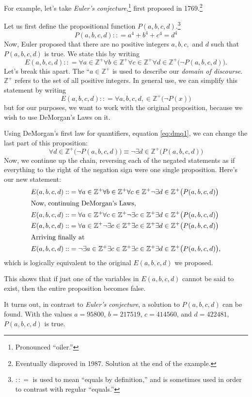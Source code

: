 \begin{ex}
  For example, let's take \emph{Euler's conjecture},\footnote{Pronounced ``oiler.''} first proposed in 1769.\footnote{Eventually disproved in 1987. Solution at the end of the example.}

  Let us first define the propositional function $P(a,b,c,d)$.\footnote{ $ : : = $ is used to mean ``equals by definition,'' and is sometimes used in order to contrast with regular ``equals.''}
  \[P(a,b,c,d) : : =
    a^4 + b^4 + c^4 = d^4\]
Now, Euler proposed that there are no positive integers $a, b, c,$ and $d$ such that $P(a,b,c,d)$ is true. We state this by writing
  \[ E(a,b,c,d) : : =
    \forall a \in \mathbb{Z^+}
    \forall b \in \mathbb{Z^+}
    \forall c \in \mathbb{Z^+}
    \forall d \in \mathbb{Z^+}
    \big(\neg P(a,b,c,d) \big).\]
Let's break this apart.
The ``$a \in \mathbb{Z^+}$ is used to describe our \emph{domain of discourse}.
$\mathbb{Z^+}$ refers to the set of all positive integers.
In general use, we can simplify this statement by writing
\[ E(a,b,c,d) : : =
  \forall a,b,c,d, \in \mathbb{Z^+} \big( \neg P(x)\big)\]
but for our purposes, we want to work with the original proposition, because we wish to use DeMorgan's Laws on it.

Using DeMorgan's first law for quantifiers, equation \eqref{eq:dmq1}, we can change the last part of this proposition:
\[\forall d \in \mathbb{Z^+} \big(\neg P(a,b,c,d)\big)\equiv \neg \exists d \in \mathbb{Z^+} \big(P(a,b,c,d)\big)\]
Now, we continue up the chain, reversing each of the negated statements as if everything to the right of the negation sign were one single proposition.
Here's our new statement:
\begin{align*}
  E(a,b,c,d) : : &=
  \forall a \in \mathbb{Z^+}
  \forall b \in \mathbb{Z^+}
  \forall c \in \mathbb{Z^+}
  \neg\exists d \in \mathbb{Z^+}
  \big( P(a,b,c,d) \big)\\
  \intertext{Now, continuing DeMorgan's Laws,}
  E(a,b,c,d) : : &=
  \forall a \in \mathbb{Z^+}
  \forall c \in \mathbb{Z^+}
  \neg\exists c \in \mathbb{Z^+}
  \exists d \in \mathbb{Z^+}
  \big( P(a,b,c,d) \big)\\
  E(a,b,c,d) : : &=
  \forall a \in \mathbb{Z^+}
  \neg\exists c \in \mathbb{Z^+}
  \exists c \in \mathbb{Z^+}
  \exists d \in \mathbb{Z^+}
  \big( P(a,b,c,d) \big)\\
  \intertext{Arriving finally at}
  E(a,b,c,d) : : &=
  \neg\exists a \in \mathbb{Z^+}
  \exists c \in \mathbb{Z^+}
  \exists c \in \mathbb{Z^+}
  \exists d \in \mathbb{Z^+}
  \big( P(a,b,c,d) \big),\\
\end{align*}
which is logically equivalent to the original $E(a,b,c,d)$ we proposed.

This shows that if just one of the variables in $E(a,b,c,d)$ cannot be said to exist, then the entire proposition becomes false.

It turns out, in contrast to \emph{Euler's conjecture}, a solution to $P(a,b,c,d)$ can be found. With the values $a=95800$, $b=217519$, $c=414560$, and $d=422481$, $P(a,b,c,d)$ is true.
\end{ex}

